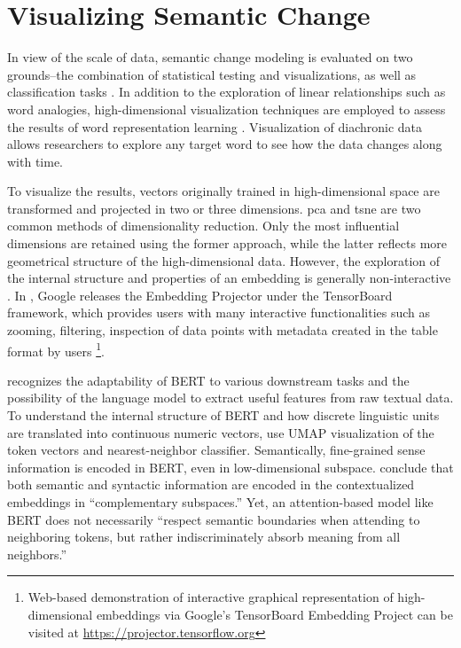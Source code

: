 \section{Visualizing Semantic Change}
In view of the scale of data, semantic change modeling is evaluated on two grounds--the combination of statistical testing and visualizations, as well as classification tasks \parencite{tang2018state}. In addition to the exploration of linear relationships such as word analogies, high-dimensional visualization techniques are employed to assess the results of word representation learning \parencite{liu2017visual}. Visualization of diachronic data allows researchers to explore any target word to see how the data changes along with time.

To visualize the results, vectors originally trained in high-dimensional space are transformed and projected in two or three dimensions. \gls{pca} and \gls{tsne} \parencite{vandermaaten2008tsne} are two common methods of dimensionality reduction. Only the most influential dimensions are retained using the former approach, while the latter reflects more geometrical structure of the high-dimensional data. However, the exploration of the internal structure and properties of an embedding is generally non-interactive \parencite{smilkov2016projector}. In \citeyear{smilkov2016projector}, Google releases the Embedding Projector under the TensorBoard framework, which provides users with many interactive functionalities such as zooming, filtering, inspection of data points with metadata created in the table format by users \parencite{smilkov2016projector}\footnote{Web-based demonstration of interactive graphical representation of high-dimensional embeddings via Google's TensorBoard Embedding Project can be visited at \url{https://projector.tensorflow.org}}.

\textcite{coenen2019visualizing} recognizes the adaptability of BERT to various downstream tasks and the possibility of the language model to extract useful features from raw textual data. To understand the internal structure of BERT and how discrete linguistic units are translated into continuous numeric vectors, \textcite{coenen2019visualizing} use UMAP visualization of the token vectors and nearest-neighbor classifier. Semantically, fine-grained sense information is encoded in BERT, even in low-dimensional subspace. \textcite{coenen2019visualizing} conclude that both semantic and syntactic information are encoded in the contextualized embeddings in ``complementary subspaces.'' Yet, an attention-based model like BERT does not necessarily ``respect semantic boundaries when attending to neighboring tokens, but rather indiscriminately absorb meaning from all neighbors.'' \parencite{coenen2019visualizing}

